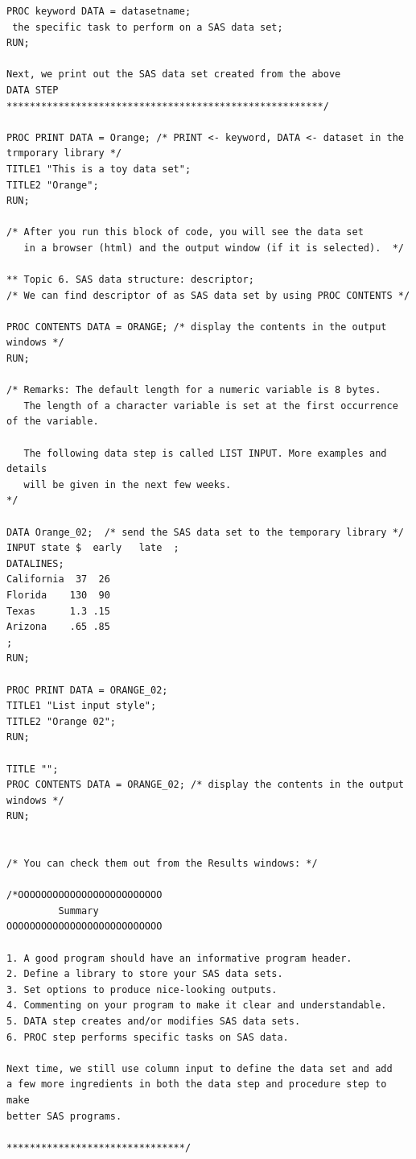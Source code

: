 \documentclass[
]{book}
\begin{document}
\begin{verbatim}
PROC keyword DATA = datasetname;
 the specific task to perform on a SAS data set;
RUN;

Next, we print out the SAS data set created from the above 
DATA STEP
*******************************************************/

PROC PRINT DATA = Orange; /* PRINT <- keyword, DATA <- dataset in the trmporary library */
TITLE1 "This is a toy data set";
TITLE2 "Orange";
RUN;

/* After you run this block of code, you will see the data set
   in a browser (html) and the output window (if it is selected).  */

** Topic 6. SAS data structure: descriptor;
/* We can find descriptor of as SAS data set by using PROC CONTENTS */

PROC CONTENTS DATA = ORANGE; /* display the contents in the output windows */
RUN;

/* Remarks: The default length for a numeric variable is 8 bytes. 
   The length of a character variable is set at the first occurrence of the variable.

   The following data step is called LIST INPUT. More examples and details 
   will be given in the next few weeks.
*/

DATA Orange_02;  /* send the SAS data set to the temporary library */        
INPUT state $  early   late  ; 
DATALINES; 
California  37  26
Florida    130  90
Texas      1.3 .15
Arizona    .65 .85
;
RUN;

PROC PRINT DATA = ORANGE_02;
TITLE1 "List input style";
TITLE2 "Orange 02";
RUN;

TITLE "";
PROC CONTENTS DATA = ORANGE_02; /* display the contents in the output windows */
RUN;


/* You can check them out from the Results windows: */

/*OOOOOOOOOOOOOOOOOOOOOOOOO
         Summary
OOOOOOOOOOOOOOOOOOOOOOOOOOO

1. A good program should have an informative program header.
2. Define a library to store your SAS data sets. 
3. Set options to produce nice-looking outputs.
4. Commenting on your program to make it clear and understandable.
5. DATA step creates and/or modifies SAS data sets.
6. PROC step performs specific tasks on SAS data.

Next time, we still use column input to define the data set and add 
a few more ingredients in both the data step and procedure step to make 
better SAS programs.

*******************************/
\end{verbatim}
\end{document}

